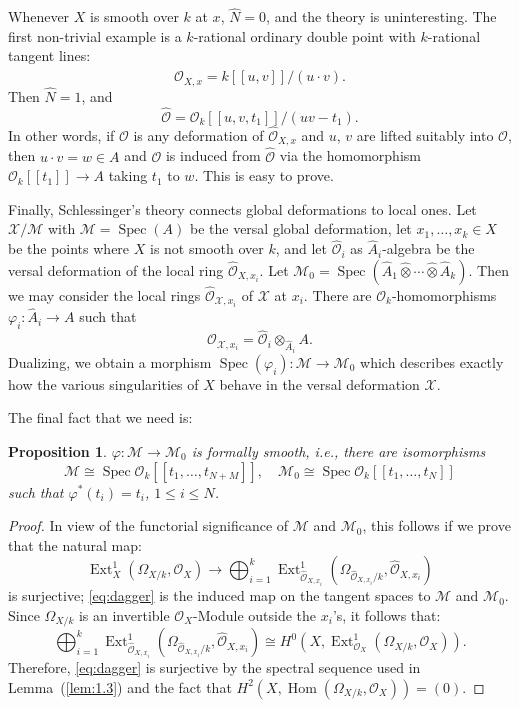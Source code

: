 \documentclass[10pt]{amsart}
\theoremstyle{plain}
\newtheorem{proposition}[theorem]{Proposition}
\theoremstyle{definition}
\DeclareMathOperator{\Ext}{Ext}
\DeclareMathOperator{\Hom}{Hom}
\DeclareMathOperator{\Spec}{Spec}
\newcommand{\cO}{\mathcal{O}}
\begin{document}
Whenever $X$ is smooth over $k$ at $x$, $\widehat{N} = 0$, and the theory is uninteresting. The first non-trivial example is a $k$-rational ordinary double point with $k$-rational tangent lines:
\[
\widehat{\cO}_{X,x} = k[[u,v]]/(u \cdot v).
\]
Then $\widehat{N} = 1$, and
\[
\widehat{\mathcal{O}} = \mathcal{O}_k[[u,v,t_1]]/(uv - t_1).
\]
In other words, if $\mathcal{O}$ is any deformation of $\widehat{\cO}_{X,x}$ and $u$, $v$ are lifted suitably into $\mathcal{O}$, then $u \cdot v = w \in A$ and $\mathcal{O}$ is induced from $\widehat{\mathcal{O}}$ via the homomorphism $\mathcal{O}_k[[t_1]] \to A$ taking $t_1$ to $w$. This is easy to prove.

Finally, Schlessinger's theory connects global deformations to local ones. Let $\mathscr{X}/\mathscr{M}$ with $\mathscr{M} = \Spec(A)$ be the versal global deformation, let $x_1, \ldots, x_k \in X$ be the points where $X$ is not smooth over $k$, and let $\widehat{\mathcal{O}}_i$ as $\widehat{A}_i$-algebra be the versal deformation of the local ring $\widehat{\cO}_{X,x_i}$. Let $\mathscr{M}_0 = \Spec(\widehat{A}_1 \widehat{\otimes} \cdots \widehat{\otimes} \widehat{A}_k)$. Then we may consider the local rings $\widehat{\cO}_{\mathscr{X},x_i}$ of $\mathscr{X}$ at $x_i$. There are $\mathcal{O}_k$-homomorphisms $\varphi_i: \widehat{A}_i \to A$ such that
\[
\widehat{\cO}_{\mathscr{X},x_i} = \widehat{\mathcal{O}}_i \otimes_{\widehat{A}_i} A.
\]
Dualizing, we obtain a morphism $\Spec(\varphi_i): \mathscr{M} \to \mathscr{M}_0$ which describes exactly how the various singularities of $X$ behave in the versal deformation $\mathscr{X}$.

The final fact that we need is:

\begin{proposition}\label{prop:1.5}
$\varphi: \mathscr{M} \to \mathscr{M}_0$ is formally smooth, i.e., there are isomorphisms
\[
\mathscr{M} \cong \Spec \mathcal{O}_k[[t_1, \ldots, t_{N+M}]], \quad \mathscr{M}_0 \cong \Spec \mathcal{O}_k[[t_1, \ldots, t_N]]
\]
such that $\varphi^*(t_i) = t_i$, $1 \leq i \leq N$.
\end{proposition}

\begin{proof}
In view of the functorial significance of $\mathscr{M}$ and $\mathscr{M}_0$, this follows if we prove that the natural map:
\begin{equation}\tag{$\dagger$}\label{eq:dagger}
\Ext^1_X(\Omega_{X/k}, \cO_X) \longrightarrow \bigoplus_{i=1}^k \Ext^1_{\widehat{\cO}_{X,x_i}}(\Omega_{\widehat{\cO}_{X,x_i}/k}, \widehat{\cO}_{X,x_i})
\end{equation}
is surjective; \eqref{eq:dagger} is the induced map on the tangent spaces to $\mathscr{M}$ and $\mathscr{M}_0$. Since $\Omega_{X/k}$ is an invertible $\cO_X$-Module outside the $x_i$'s, it follows that:
\[
\bigoplus_{i=1}^k \Ext^1_{\widehat{\cO}_{X,x_i}}(\Omega_{\widehat{\cO}_{X,x_i}/k}, \widehat{\cO}_{X,x_i}) \cong H^0(X, \Ext^1_{\cO_X}(\Omega_{X/k}, \cO_X)).
\]
Therefore, \eqref{eq:dagger} is surjective by the spectral sequence used in Lemma~(\ref{lem:1.3}) and the fact that $H^2(X, \Hom(\Omega_{X/k}, \cO_X)) = (0)$.
\end{proof}
\end{document}
